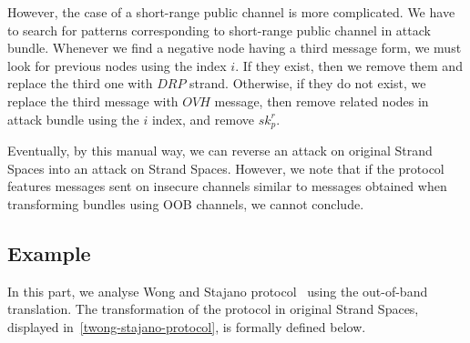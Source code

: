However, the case of a short-range public channel is more complicated. We have to search for patterns corresponding to short-range public channel in attack bundle. Whenever we find a negative node having a third message form, we must look for previous nodes using the index $i$. If they exist, then we remove them and replace the third one with $DRP$ strand. Otherwise, if they do not exist, we replace the third message with $OVH$ message, then remove related nodes in attack bundle using the $i$ index, and remove $sk^r_p$.

Eventually, by this manual way, we can reverse an attack on original Strand Spaces into an attack on Strand Spaces. However, we note that if the protocol features messages sent on insecure channels similar to messages obtained when transforming bundles using OOB channels, we cannot conclude. 

\subsection{Example}

In this part, we analyse Wong and Stajano protocol~\cite{10.1109/MPRV.2007.76} using the out-of-band translation. The transformation of the protocol in original Strand Spaces, displayed in~\ref{twong-stajano-protocol}, is formally defined below. 

